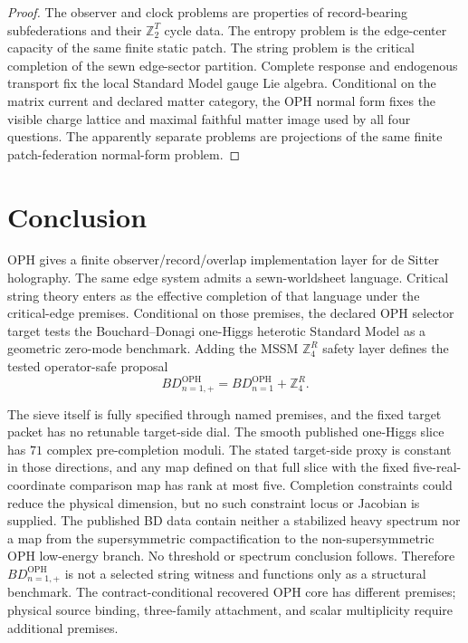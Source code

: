 \documentclass[11pt]{article}
\theoremstyle{remark}
\theoremstyle{plain}
\newcommand{\OPH}{\mathrm{OPH}}
\newcommand{\Z}{\mathbb Z}
\newcommand{\ZfourR}{\mathbb Z_4^R}
\begin{document}
\begin{proof}
The observer and clock problems are properties of record-bearing subfederations and their
\(\Z_2^T\) cycle data. The entropy problem is the edge-center capacity of the same finite static
patch. The string problem is the critical completion of the sewn edge-sector partition.
Complete response and endogenous transport fix the local Standard Model gauge Lie algebra. Conditional on
the matrix current and declared matter category, the OPH normal form fixes
the visible charge lattice and maximal faithful matter image used by all four questions. The apparently separate
problems are projections of the same finite patch-federation normal-form problem.
\end{proof}

\section{Conclusion}

OPH gives a finite observer/record/overlap implementation layer for de Sitter holography. The
same edge system admits a sewn-worldsheet language. Critical string theory enters as the
effective completion of that language under the critical-edge premises. Conditional
on those premises, the declared OPH selector target tests the
Bouchard--Donagi one-Higgs heterotic Standard Model as a geometric zero-mode benchmark. Adding the MSSM
\(\ZfourR\) safety layer defines the tested operator-safe proposal
\[
BD_{n=1,+}^{\OPH}=BD_{n=1}^{\OPH}+\ZfourR.
\]

The sieve itself is fully specified through named premises, and the fixed target packet has no
retunable target-side dial. The smooth published one-Higgs
slice has \(71\) complex pre-completion moduli. The stated target-side proxy is constant in those
directions, and any map defined on that full slice with the fixed five-real-coordinate comparison map
has rank at most five. Completion constraints could reduce the physical dimension, but no such
constraint locus or Jacobian is supplied. The published BD data contain neither a stabilized
heavy spectrum nor a map from the supersymmetric compactification to the non-supersymmetric OPH
low-energy branch. No threshold or spectrum conclusion follows. Therefore \(BD_{n=1,+}^{\OPH}\) is not a
selected string witness and functions only as a structural benchmark. The
contract-conditional recovered OPH core has different premises; physical source binding,
three-family attachment, and scalar multiplicity require additional premises.
\end{document}
